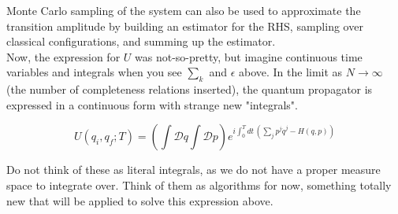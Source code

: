 \noindent Monte Carlo sampling of the system can also be used to approximate the transition amplitude by building an estimator for the RHS, sampling over classical configurations, and summing up the estimator. \\

\noindent Now, the expression for $U$ was not-so-pretty, but imagine continuous time variables and integrals when you see $\sum_k$ and $\epsilon$ above. In the limit as $N \rightarrow \infty$ (the number of completeness relations inserted), the quantum propagator is expressed in a continuous form with strange new "integrals".

\begin{equation}
U(q_i, q_f; T) = \left( \int \mathcal{D}q \int \mathcal{D} p \right) e^{i \int_0^T dt \, (\sum_j p^j \dot{q}^j - H(q,p))}
\end{equation}

\noindent Do not think of these as literal integrals, as we do not have a proper measure space to integrate over. Think of them as algorithms for now, something totally new that will be applied to solve this expression above.
